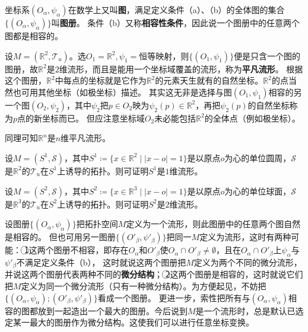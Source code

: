 \begin{definition}
坐标系$(O_\alpha, \psi_\alpha)$在数学上又叫\textbf{图}，满足定义条件（a）、（b）的全体图的集合$\{(O_\alpha, \psi_\alpha)\}$叫\textbf{图册}。
条件（b）又称\textbf{相容性条件}，因此说一个图册中的任意两个图都是相容的。
\end{definition}

\begin{example}
设$M = (\mathbb{R}^2, \mathscr{T}_u)$。选$O_1 = \mathbb{R}^2, \psi_1 =\text{恒等映射}$，则$\{(O_1, \psi_1)\}$便是只含一个图的图册，故$\mathbb{R}^2$是$2$维流形，而且是能用一个坐标域覆盖的流形，称为\textbf{平凡流形}。
根据这个图册，$\mathbb{R}^2$中每点的坐标就是它作为$\mathbb{R}^2$的元素天生就有的自然坐标。$\mathbb{R}^2$的点当然也可用其他坐标（如极坐标）描述。
其实这无非是选择与图$(O_1, \psi_1)$相容的另一个图$(O_2, \psi_2)$，其中$\psi_2$把$p \in O_2$映为$\psi_2(p) \in \mathbb{R}^2$，再把$\psi_2(p)$的自然坐标称为$p$点的新坐标而已。
但应注意坐标域$O_2$未必能包括$\mathbb{R}^2$的全体点（例如极坐标）。

同理可知$\mathbb{R}^n$是$n$维平凡流形。
\end{example}

\begin{example}
设$M = (S^1, \mathscr{S})$，其中$S^1 \coloneq \{x \in \mathbb{R}^2 \mid |x - o| = 1\}$是以原点$o$为心的单位圆周，$\mathscr{S}$是$\mathbb{R}^2$的$\mathscr{T}_u$在$S^1$上诱导的拓扑。则可证明$S^1$是$1$维流形。
\end{example}

\begin{example}
设$M = (S^2, \mathscr{S})$，其中$S^2 \coloneq \{x \in \mathbb{R}^3 \mid |x - o| = 1\}$是以原点$o$为心的单位球面，$\mathscr{S}$是$\mathbb{R}^3$的$\mathscr{T}_u$在$S^2$上诱导的拓扑。则可证明$S^2$是$2$维流形。
\end{example}

设图册$\{(O_\alpha, \psi_\alpha)\}$把拓扑空间$M$定义为一个流形，则此图册中的任意两个图自然是相容的。
但也可用另一图册$\{(O'_\beta, \psi'_\beta)\}$把同一$M$定义为流形，这时有两种可能：
\textcircled{1}这两个图册不相容，即存在$O_\alpha$和$O'_\beta$使$O_\alpha \cap O'_\beta \neq \emptyset$，且在$O_\alpha \cap O'_\beta$上$\psi_\alpha$与$\psi'_\beta$不满足定义条件（b），
这时就说这两个图册把$M$定义为两个不同的微分流形，并说这两个图册代表两种不同的\textbf{微分结构}；
\textcircled{2}这两个图册是相容的，这时就说它们把$M$定义为同一个微分流形（只有一种微分结构）。为方便起见，不妨把$\{(O_\alpha, \psi_\alpha); (O'_\beta, \psi'_\beta)\}$看成一个图册。
更进一步，索性把所有与$(O_\alpha, \psi_\alpha)$相容的图都放到一起造出一个最大的图册。今后说到$M$是一个流形时，总是默认已选定某一最大的图册作为微分结构。这使我们可以进行任意坐标变换。

